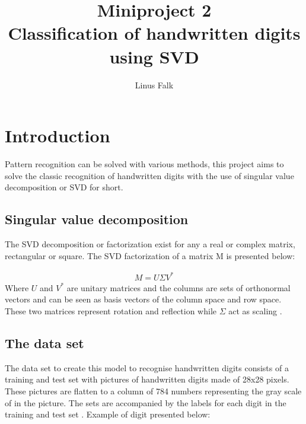 \documentclass[a4paper]{article}
\title{Miniproject 2 \\ Classification of handwritten digits using SVD}
\author{Linus Falk}
\begin{document}
\maketitle
\section*{Introduction}
Pattern recognition can be solved with various methods, this project aims to solve the classic recognition of handwritten digits with the use of singular value decomposition or SVD for short. 

\subsection*{Singular value decomposition}
The SVD decomposition or factorization exist for any  a real or complex matrix, rectangular or square. The SVD factorization of a matrix M is presented below:

\begin{equation}
	\begin{aligned}
		M = U \Sigma V^{*}
	\end{aligned}
\end{equation}
Where $U$ and $V^{*}$ are unitary matrices and the columns are sets of orthonormal vectors and can be seen as basis vectors of the column space and row space. These two matrices represent rotation and reflection while $\Sigma$ act as scaling \citep{svd}.

\subsection*{The data set}
The data set to create this model to recognise handwritten digits consists of a training and test  set with pictures of handwritten digits made of 28x28 pixels. These pictures are flatten to a column of 784 numbers representing the gray scale of in the picture. The sets are accompanied by the labels for each digit in the training and test set \citep{note} . Example of digit presented below:
\end{document}
